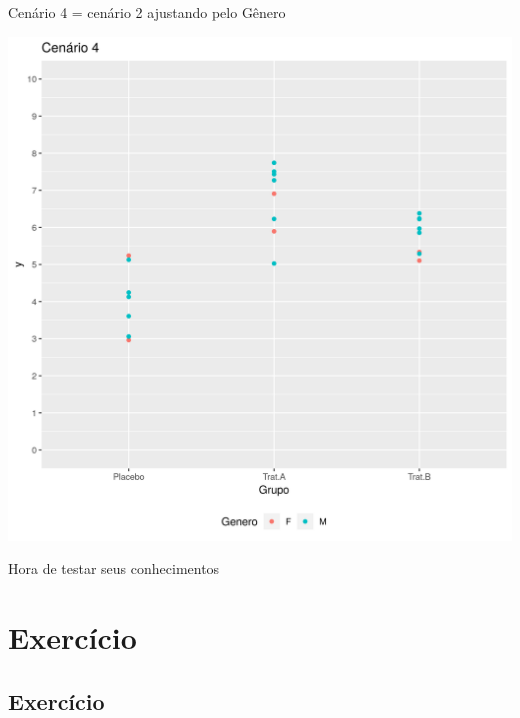 \documentclass{beamer}
\begin{document}

\begin{frame}[label=cenario4]{\small Cenário 4 = cenário 2 ajustando pelo Gênero}
  \begin{center}
    \includegraphics[height=.9\textheight]{Cap13-30/cenario22}
  \end{center}
\end{frame}

\begin{frame}
  \begin{center}
    Hora de testar seus conhecimentos
  \end{center}
\end{frame}

\section{Exercício}

\subsection{Exercício}



\end{document}
